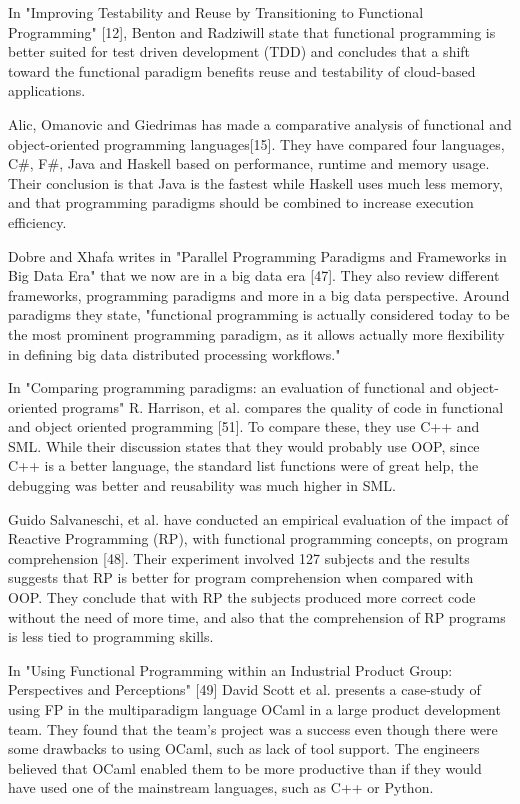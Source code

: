 \documentclass {article}
\begin{document}
In "Improving Testability and Reuse by Transitioning to Functional Programming" [12], Benton and Radziwill state that functional programming is better suited for test driven development (TDD) and concludes that a shift toward the functional paradigm benefits reuse and testability of cloud-based applications.

Alic, Omanovic and Giedrimas has made a comparative analysis of functional and object-oriented programming languages[15]. They have compared four languages, C\#, F\#, Java and Haskell based on performance, runtime and memory usage. Their conclusion is that Java is the fastest while Haskell uses much less memory, and that programming paradigms should be combined to increase execution efficiency. 

Dobre and Xhafa writes in "Parallel Programming Paradigms and Frameworks in Big Data Era" that we now are in a big data era [47]. They also review different frameworks, programming paradigms and more in a big data perspective. Around paradigms they state, "functional programming is actually considered today to be the most prominent programming paradigm, as it allows actually more flexibility in defining big data distributed processing workflows."

In "Comparing programming paradigms: an evaluation of functional and object-oriented programs" R. Harrison, et al. compares the quality of code in functional and object oriented programming [51]. To compare these, they use C++ and SML. While their discussion states that they would probably use OOP, since C++ is a better language, the standard list functions were of great help, the debugging was better and reusability was much higher in SML.

Guido Salvaneschi, et al. have conducted an empirical evaluation of the impact of Reactive Programming (RP), with functional programming concepts, on program comprehension [48]. Their experiment involved 127 subjects and the results suggests that RP is better for program comprehension when compared with OOP. They conclude that with RP the subjects produced more correct code without the need of more time, and also that the comprehension of RP programs is less tied to programming skills. 

In "Using Functional Programming within an Industrial Product Group: Perspectives and Perceptions" [49] David Scott et al. presents a case-study of using FP in the multiparadigm language OCaml in a large product development team. They found that the team's project was a success even though there were some drawbacks to using OCaml, such as lack of tool support. The engineers believed that OCaml enabled them to be more productive than if they would have used one of the mainstream languages, such as C++ or Python.
\end{document}
